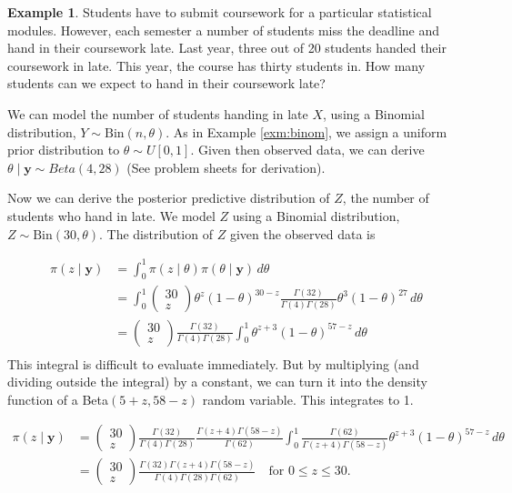 \documentclass[
]{book}
\theoremstyle{definition}
\theoremstyle{definition}
\newtheorem{example}{Example}[chapter]
\theoremstyle{definition}
\theoremstyle{definition}
\theoremstyle{remark}
\begin{document}
\begin{example}

Students have to submit coursework for a particular statistical modules. However, each semester a number of students miss the deadline and hand in their coursework late. Last year, three out of 20 students handed their coursework in late. This year, the course has thirty students in. How many students can we expect to hand in their coursework late?

We can model the number of students handing in late \(X\), using a Binomial distribution, \(Y \sim \textrm{Bin}(n, \theta)\). As in Example \ref{exm:binom}, we assign a uniform prior distribution to \(\theta \sim U[0, 1]\). Given then observed data, we can derive \(\theta \mid \boldsymbol{y} \sim Beta(4, 28)\) (See problem sheets for derivation).

Now we can derive the posterior predictive distribution of \(Z\), the number of students who hand in late. We model \(Z\) using a Binomial distribution, \(Z \sim \textrm{Bin}(30, \theta)\). The distribution of \(Z\) given the observed data is

\begin{align*}
\pi(z \mid \boldsymbol{y}) &= \int_0^1 \pi(z \mid \theta) \pi(\theta \mid \boldsymbol{y})\, d\theta \\
& = \int_0^1 \begin{pmatrix} 30 \\ z \end{pmatrix} \theta^z (1-\theta)^{30 - z} \frac{\Gamma(32)}{\Gamma(4)\Gamma(28)}\theta^{3}(1-\theta)^{27}\, d\theta \\
 & = \begin{pmatrix} 30 \\ z \end{pmatrix}\frac{\Gamma(32)}{\Gamma(4)\Gamma(28)}\int_0^1 \theta^{z + 3}(1-\theta)^{57 - z}\, d\theta \\
\end{align*}
This integral is difficult to evaluate immediately. But by multiplying (and dividing outside the integral) by a constant, we can turn it into the density function of a Beta\((5 + z, 58 - z)\) random variable. This integrates to 1.

\begin{align*}
\pi(z \mid \boldsymbol{y})  & = \begin{pmatrix} 30 \\ z \end{pmatrix}\frac{\Gamma(32)}{\Gamma(4)\Gamma(28)}\frac{\Gamma(z+4)\Gamma(58-z)}{\Gamma(62)}\int_0^1 \frac{\Gamma(62)}{\Gamma(z+4)\Gamma(58-z)}\theta^{z + 3}(1-\theta)^{57 - z}\, d\theta \\ 
& = \begin{pmatrix} 30 \\ z \end{pmatrix}\frac{\Gamma(32)\Gamma(z+4)\Gamma(58-z)}{\Gamma(4)\Gamma(28)\Gamma(62)} \quad \textrm{for } 0 \leq z \leq 30.
\end{align*}


\end{example}
\end{document}
